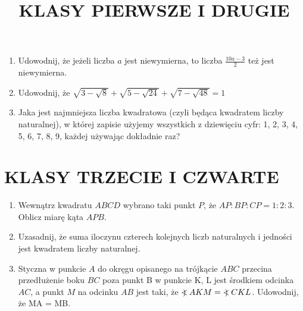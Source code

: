 \documentclass[10pt]{article}
\title{KLASY PIERWSZE I DRUGIE }
\author{}
\date{}
\newcommand\Varangle{\mathop{{<\!\!\!\!\!\text{\small)}}\:}\nolimits}
\begin{document}
\maketitle
\begin{enumerate}
  \item Udowodnij, że jeżeli liczba \(a\) jest niewymierna, to liczba \(\frac{10 a-3}{2}\) też jest niewymierna.
  \item Udowodnij, że \(\sqrt{3-\sqrt{8}}+\sqrt{5-\sqrt{24}}+\sqrt{7-\sqrt{48}}=1\)
  \item Jaka jest najmniejsza liczba kwadratowa (czyli będąca kwadratem liczby naturalnej), w której zapisie użyjemy wszystkich z dziewięciu cyfr: 1, 2, 3, 4, 5, 6, 7, 8, 9, każdej używając dokładnie raz?
\end{enumerate}

\section*{KLASY TRZECIE I CZWARTE}
\begin{enumerate}
  \item Wewnątrz kwadratu \(A B C D\) wybrano taki punkt \(P\), że \(A P: B P: C P=1: 2: 3\). Oblicz miarę kąta \(A P B\).
  \item Uzasadnij, że suma iloczynu czterech kolejnych liczb naturalnych i jedności jest kwadratem liczby naturalnej.
  \item Styczna w punkcie \(A\) do okręgu opisanego na trójkącie \(A B C\) przecina przedłużenie boku \(B C\) poza punkt B w punkcie K, L jest środkiem odcinka \(A C\), a punkt \(M\) na odcinku \(A B\) jest taki, że \(\Varangle A K M=\Varangle C K L\). Udowodnij, że MA = MB.
\end{enumerate}
\end{document}
